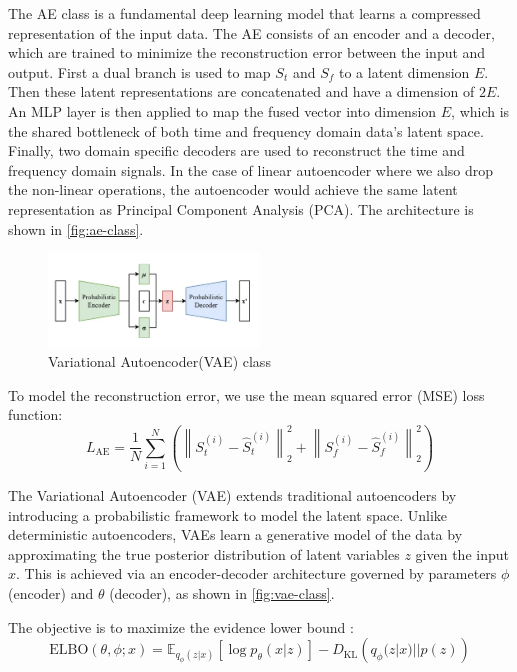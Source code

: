 \documentclass[12pt]{article}
\begin{document}
The AE class is a fundamental deep learning model that learns a compressed representation of the input data. The AE consists of an encoder and a decoder, which are trained to minimize the reconstruction error between the input and output.  First a dual branch is used to map $S_t$ and $S_f$ to a latent dimension $E$. Then these latent representations are concatenated and have a dimension of $2E$. An MLP layer is then applied to map the fused vector into dimension $E$, which is the shared bottleneck of both time and frequency domain data's latent space. Finally, two domain specific decoders are used to reconstruct the time and frequency domain signals. In the case of linear autoencoder where we also drop the non-linear operations, the autoencoder would achieve the same latent representation as Principal Component Analysis (PCA). The architecture is shown in \autoref{fig:ae-class}.

\begin{figure}[htbp]
    \centering
    \includegraphics[width=0.5\textwidth]{vae-class.png}
    \caption{Variational Autoencoder(VAE) class}
    \label{fig:vae-class}
\end{figure}


To model the reconstruction error, we use the mean squared error (MSE) loss function:
$$
    L_{\text{AE}} = \frac{1}{N} \sum_{i=1}^{N} \left( \left\| S_{t}^{(i)} - \hat{S}_{t}^{(i)} \right\|_{2}^{2} + \left\| S_{f}^{(i)} - \hat{S}_{f}^{(i)} \right\|_{2}^{2} \right)
$$


The Variational Autoencoder (VAE) extends traditional autoencoders by introducing a probabilistic framework to model the latent space. Unlike deterministic autoencoders, VAEs learn a generative model of the data by approximating the true posterior distribution of latent variables $z$ given the input $x$. This is achieved via an encoder-decoder architecture governed by parameters $\phi$(encoder) and $\theta$ (decoder), as shown in \autoref{fig:vae-class}.

The objective is to maximize the evidence lower bound :
$$
    \text{ELBO}(\theta,\phi;x) = \mathbb{E}_{q_{\phi}(z|x)} \left[ \log p_{\theta}(x|z) \right] -  D_{\text{KL}} \left( q_{\phi}(z|x) || p(z) \right)
$$
\end{document}

